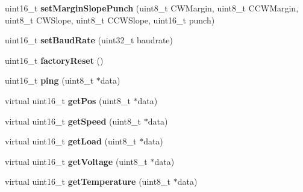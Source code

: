 \begin{DoxyCompactItemize}
\item 
uint16\+\_\+t {\bfseries set\+Margin\+Slope\+Punch} (uint8\+\_\+t C\+W\+Margin, uint8\+\_\+t C\+C\+W\+Margin, uint8\+\_\+t C\+W\+Slope, uint8\+\_\+t C\+C\+W\+Slope, uint16\+\_\+t punch)\hypertarget{classCytron__G15__Servo_a1573aab50488f1c6fc8f60fda743588d}{}\label{classCytron__G15__Servo_a1573aab50488f1c6fc8f60fda743588d}

\item 
uint16\+\_\+t {\bfseries set\+Baud\+Rate} (uint32\+\_\+t baudrate)\hypertarget{classCytron__G15__Servo_a6e1bf5fb5fe1a8a394a635930f7baaeb}{}\label{classCytron__G15__Servo_a6e1bf5fb5fe1a8a394a635930f7baaeb}

\item 
uint16\+\_\+t {\bfseries factory\+Reset} ()\hypertarget{classCytron__G15__Servo_a337497c9ac0f8048e89cd5a10046fe16}{}\label{classCytron__G15__Servo_a337497c9ac0f8048e89cd5a10046fe16}

\item 
uint16\+\_\+t {\bfseries ping} (uint8\+\_\+t $\ast$data)\hypertarget{classCytron__G15__Servo_a1f040caa0df97184da83bc3586495fd8}{}\label{classCytron__G15__Servo_a1f040caa0df97184da83bc3586495fd8}

\item 
virtual uint16\+\_\+t {\bfseries get\+Pos} (uint8\+\_\+t $\ast$data)\hypertarget{classCytron__G15__Servo_aa36275b14ba285e655c05324742189d4}{}\label{classCytron__G15__Servo_aa36275b14ba285e655c05324742189d4}

\item 
virtual uint16\+\_\+t {\bfseries get\+Speed} (uint8\+\_\+t $\ast$data)\hypertarget{classCytron__G15__Servo_a831b8c81e9f454cb501bd37a236acd1c}{}\label{classCytron__G15__Servo_a831b8c81e9f454cb501bd37a236acd1c}

\item 
virtual uint16\+\_\+t {\bfseries get\+Load} (uint8\+\_\+t $\ast$data)\hypertarget{classCytron__G15__Servo_a1c4d4e66b578f100bfb92ba1494f56f4}{}\label{classCytron__G15__Servo_a1c4d4e66b578f100bfb92ba1494f56f4}

\item 
virtual uint16\+\_\+t {\bfseries get\+Voltage} (uint8\+\_\+t $\ast$data)\hypertarget{classCytron__G15__Servo_ad11a3003e8db88b81d63baf23c7a7cf3}{}\label{classCytron__G15__Servo_ad11a3003e8db88b81d63baf23c7a7cf3}

\item 
virtual uint16\+\_\+t {\bfseries get\+Temperature} (uint8\+\_\+t $\ast$data)\hypertarget{classCytron__G15__Servo_aca2afd822031d37ffb9f5973370517f6}{}\label{classCytron__G15__Servo_aca2afd822031d37ffb9f5973370517f6}


\end{DoxyCompactItemize}

